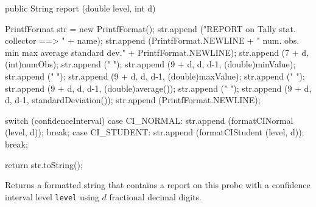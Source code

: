 \begin{code}

   public String report (double level, int d) \begin{hide} {
      PrintfFormat str = new PrintfFormat();
      str.append ("REPORT on Tally stat. collector ==> " + name);
      str.append (PrintfFormat.NEWLINE + "    num. obs.      min          max        average     standard dev." + PrintfFormat.NEWLINE);
      str.append (7 + d, (int)numObs);   str.append (" ");
      str.append (9 + d, d, d-1, (double)minValue);   str.append (" ");
      str.append (9 + d, d, d-1, (double)maxValue);   str.append (" ");
      str.append (9 + d, d, d-1, (double)average());  str.append (" ");
      str.append (9 + d, d, d-1, standardDeviation());
      str.append (PrintfFormat.NEWLINE);

      switch (confidenceInterval) {
         case CI_NORMAL:
            str.append (formatCINormal (level, d));
            break;
         case CI_STUDENT:
            str.append (formatCIStudent (level, d));
            break;
      }

      return str.toString();
   }\end{hide}
\end{code}
 \begin{tabb}  Returns a formatted string that contains a report on this probe
  with a confidence interval level \texttt{level} using $d$
  fractional decimal digits.
 \end{tabb}
\begin{htmlonly}
\end{htmlonly}
